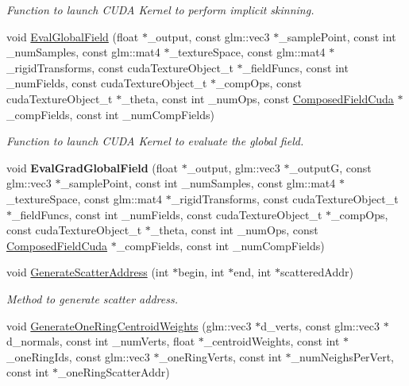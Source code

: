 \begin{DoxyCompactItemize}
\begin{DoxyCompactList}\small\item\em Function to launch C\+U\+DA Kernel to perform implicit skinning. \end{DoxyCompactList}\item 
void \hyperlink{namespaceisgw_a8eed7cf9e253eaf6b3e9651fdc3deb28}{Eval\+Global\+Field} (float $\ast$\+\_\+output, const glm\+::vec3 $\ast$\+\_\+sample\+Point, const int \+\_\+num\+Samples, const glm\+::mat4 $\ast$\+\_\+texture\+Space, const glm\+::mat4 $\ast$\+\_\+rigid\+Transforms, const cuda\+Texture\+Object\+\_\+t $\ast$\+\_\+field\+Funcs, const int \+\_\+num\+Fields, const cuda\+Texture\+Object\+\_\+t $\ast$\+\_\+comp\+Ops, const cuda\+Texture\+Object\+\_\+t $\ast$\+\_\+theta, const int \+\_\+num\+Ops, const \hyperlink{classComposedFieldCuda}{Composed\+Field\+Cuda} $\ast$\+\_\+comp\+Fields, const int \+\_\+num\+Comp\+Fields)
\begin{DoxyCompactList}\small\item\em Function to launch C\+U\+DA Kernel to evaluate the global field. \end{DoxyCompactList}\item 
void {\bfseries Eval\+Grad\+Global\+Field} (float $\ast$\+\_\+output, glm\+::vec3 $\ast$\+\_\+outputG, const glm\+::vec3 $\ast$\+\_\+sample\+Point, const int \+\_\+num\+Samples, const glm\+::mat4 $\ast$\+\_\+texture\+Space, const glm\+::mat4 $\ast$\+\_\+rigid\+Transforms, const cuda\+Texture\+Object\+\_\+t $\ast$\+\_\+field\+Funcs, const int \+\_\+num\+Fields, const cuda\+Texture\+Object\+\_\+t $\ast$\+\_\+comp\+Ops, const cuda\+Texture\+Object\+\_\+t $\ast$\+\_\+theta, const int \+\_\+num\+Ops, const \hyperlink{classComposedFieldCuda}{Composed\+Field\+Cuda} $\ast$\+\_\+comp\+Fields, const int \+\_\+num\+Comp\+Fields)\hypertarget{namespaceisgw_ad3f1a323ddd56e99eea0afe0d7fd42f0}{}\label{namespaceisgw_ad3f1a323ddd56e99eea0afe0d7fd42f0}

\item 
void \hyperlink{namespaceisgw_a267fc0628a2245c86afb303701f45ddc}{Generate\+Scatter\+Address} (int $\ast$begin, int $\ast$end, int $\ast$scattered\+Addr)\hypertarget{namespaceisgw_a267fc0628a2245c86afb303701f45ddc}{}\label{namespaceisgw_a267fc0628a2245c86afb303701f45ddc}

\begin{DoxyCompactList}\small\item\em Method to generate scatter address. \end{DoxyCompactList}\item 
void \hyperlink{namespaceisgw_ae85bec13c1619427c06ad2e99b2e6d3b}{Generate\+One\+Ring\+Centroid\+Weights} (glm\+::vec3 $\ast$d\+\_\+verts, const glm\+::vec3 $\ast$d\+\_\+normals, const int \+\_\+num\+Verts, float $\ast$\+\_\+centroid\+Weights, const int $\ast$\+\_\+one\+Ring\+Ids, const glm\+::vec3 $\ast$\+\_\+one\+Ring\+Verts, const int $\ast$\+\_\+num\+Neighs\+Per\+Vert, const int $\ast$\+\_\+one\+Ring\+Scatter\+Addr)\hypertarget{namespaceisgw_ae85bec13c1619427c06ad2e99b2e6d3b}{}\label{namespaceisgw_ae85bec13c1619427c06ad2e99b2e6d3b}


\end{DoxyCompactItemize}
